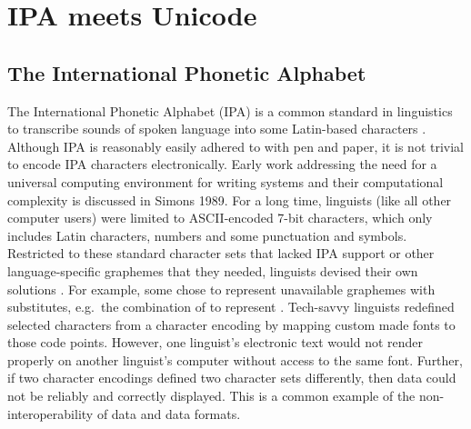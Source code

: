 \chapter{IPA meets Unicode}
\label{ipa-meets-unicode}

\section{The International Phonetic Alphabet}
\label{the-international-phonetic-alphabet}

The International Phonetic Alphabet (IPA) is a common standard in linguistics to
transcribe sounds of spoken language into some Latin-based characters
\citep{IPA2005}. Although IPA is reasonably easily adhered to with pen and
paper, it is not trivial to encode IPA characters electronically. Early work
addressing the need for a universal computing environment for writing systems
and their computational complexity is discussed in Simons 1989. For a long time,
linguists (like all other computer users) were limited to ASCII-encoded 7-bit
characters, which only includes Latin characters, numbers and some punctuation
and symbols. Restricted to these standard character sets that lacked IPA support
or other language-specific graphemes that they needed, linguists devised their
own solutions \citep{BirdSimons2003}. For example, some chose to represent
unavailable graphemes with substitutes, e.g.~the combination of to represent .
Tech-savvy linguists redefined selected characters from a character encoding by
mapping custom made fonts to those code points. However, one linguist's
electronic text would not render properly on another linguist's computer without
access to the same font. Further, if two character encodings defined two
character sets differently, then data could not be reliably and correctly
displayed. This is a common example of the non-interoperability of data and data
formats.

